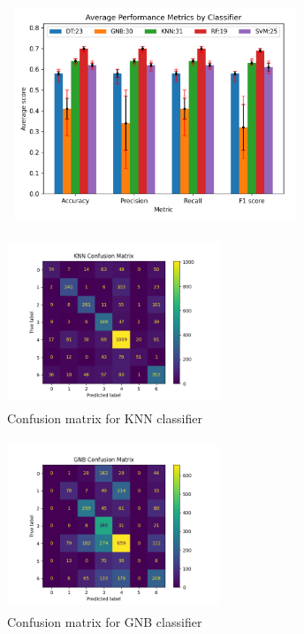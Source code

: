 \documentclass[journal,twocolumn,12pt,twoside]{IEEEtran}
\begin{document}
\begin{figure}
    \includegraphics*[width=3.5in,height=2.5in]{images/metrics.png}
    \captionsetup{font=scriptsize}
    \label{fig:bar_graph}
    \vspace{.5em}
\end{figure}

\begin{figure}
    \includegraphics[width=2.5in,height=2in]{images/KNN_Confusion_Matrix.png}
    \captionsetup{font=scriptsize}
    \caption{Confusion matrix for KNN classifier}
    \label{fig:KNN_CM}
\end{figure}

\begin{figure}
    \includegraphics[width=2.5in,height=2in]{images/GNB_Confusion_Matrix.png}
    \captionsetup{font=scriptsize}
    \caption{Confusion matrix for GNB classifier}
    \label{fig:GNB_CM}
\end{figure}
\end{document}

